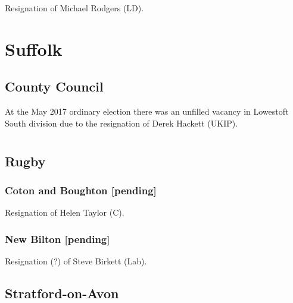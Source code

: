 \documentclass[a4paper,openany]{book}
\begin{document}
\begin{resultsiii}

Resignation of Michael Rodgers (LD).

\section{Suffolk}

\subsection*{County Council}

At the May 2017 ordinary election there was an unfilled vacancy in Lowestoft South division due to the resignation of Derek Hackett (UKIP).

\section[Warwickshire]{}

\subsection*{Rugby}

\subsubsection*{Coton and Boughton \hspace*{\fill}\nolinebreak[1]%
\enspace\hspace*{\fill}
[pending]}


Resignation of Helen Taylor (C).

\subsubsection*{New Bilton \hspace*{\fill}\nolinebreak[1]%
\enspace\hspace*{\fill}
[pending]}


Resignation (?) of Steve Birkett (Lab).

\subsection*{Stratford-on-Avon}


\end{resultsiii}
\end{document}
